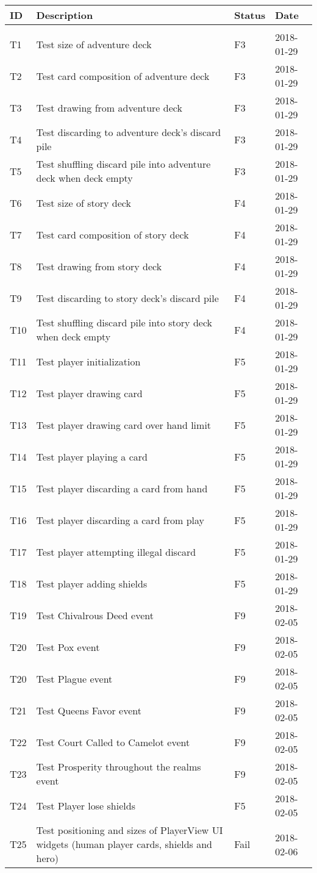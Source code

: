 \documentclass[10pt,a4paper]{article}
\begin{document}
\begin{center}
\begin{tabular}{l l l l }
ID & Description & Status & Date\\
\hline\\
T1 & Test size of adventure deck & F3 & 2018-01-29\\
T2 & Test card composition of adventure deck & F3 & 2018-01-29\\
T3 & Test drawing from adventure deck & F3 & 2018-01-29\\
T4 & Test discarding to adventure deck's discard pile & F3 & 2018-01-29\\
T5 & Test shuffling discard pile into adventure deck when deck empty & F3 & 2018-01-29\\
T6 & Test size of story deck & F4 & 2018-01-29\\
T7 & Test card composition of story deck & F4 & 2018-01-29\\
T8 & Test drawing from story deck & F4 & 2018-01-29\\
T9 & Test discarding to story deck's discard pile & F4 & 2018-01-29\\
T10 & Test shuffling discard pile into story deck when deck empty & F4 & 2018-01-29\\
T11 & Test player initialization & F5 & 2018-01-29\\
T12 & Test player drawing card & F5 & 2018-01-29\\
T13 & Test player drawing card over hand limit & F5 & 2018-01-29\\
T14 & Test player playing a card & F5 & 2018-01-29\\
T15 & Test player discarding a card from hand & F5 & 2018-01-29\\
T16 & Test player discarding a card from play & F5 & 2018-01-29\\
T17 & Test player attempting illegal discard & F5 & 2018-01-29\\
T18 & Test player adding shields & F5 & 2018-01-29\\
T19 & Test Chivalrous Deed event & F9 & 2018-02-05\\
T20 & Test Pox event & F9 & 2018-02-05\\
T20 & Test Plague event & F9 & 2018-02-05\\
T21 & Test Queens Favor event & F9 & 2018-02-05\\
T22 & Test Court Called to Camelot event & F9 & 2018-02-05\\
T23 & Test Prosperity throughout the realms event & F9 & 2018-02-05\\
T24 & Test Player lose shields & F5 & 2018-02-05\\
T25 & Test positioning and sizes of PlayerView UI widgets (human player cards, shields and hero) & Fail & 2018-02-06\\
\end{tabular}
\end{center}
\end{document}
